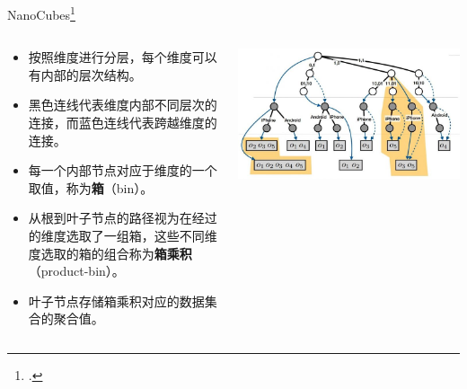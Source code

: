 \documentclass[10pt,aspectratio=169]{ctexbeamer}
\begin{document}
\begin{frame}{NanoCubes\footcite{Lins2013}}
    \begin{columns}
        \begin{column}{.65\textwidth}
            \begin{itemize}[<+->]
                \item 按照维度进行分层，每个维度可以有内部的层次结构。
                \item 黑色连线代表维度内部不同层次的连接，而蓝色连线代表跨越维度的连接。
                \item 每一个内部节点对应于维度的一个取值，称为\textbf{箱}（bin）。
                \item 从根到叶子节点的路径视为在经过的维度选取了一组箱，这些不同维度选取的箱的组合称为\textbf{箱乘积}（product-bin）。
                \item 叶子节点存储箱乘积对应的数据集合的聚合值。
            \end{itemize}
        \end{column}

        \begin{column}{.35\textwidth}
            \includegraphics[width=\textwidth]{pic/nanocubes.jpg}
        \end{column}
    \end{columns}
\end{frame}
\end{document}
